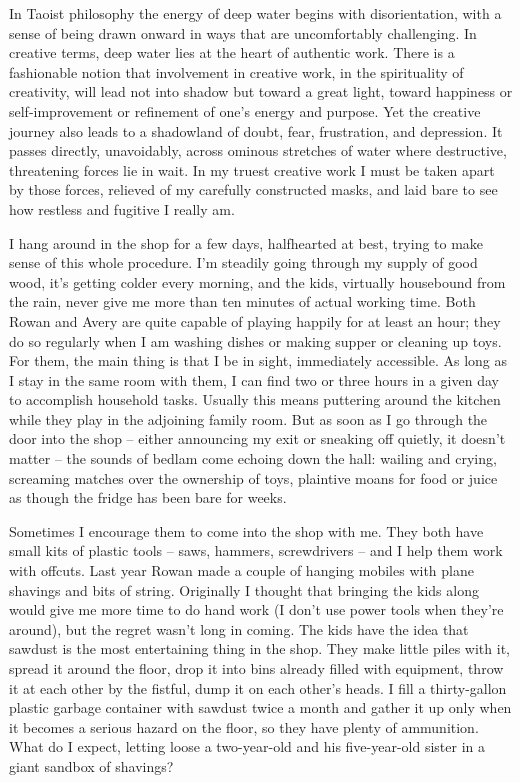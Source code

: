 \documentclass[letterpaper,10pt,headsepline]{scrreprt}
\begin{document}
In Taoist philosophy the energy of deep water begins with disorientation, with a sense of being drawn onward in ways that are uncomfortably challenging. In creative terms, deep water lies at the heart of authentic work. There is a fashionable notion that involvement in creative work, in the spirituality of creativity, will lead not into shadow but toward a great light, toward happiness or self-­improvement or refinement of one’s energy and purpose. Yet the creative journey also leads to a shadowland of doubt, fear, frustration, and depression. It passes directly, unavoidably, across ominous stretches of water where destructive, threatening forces lie in wait. In my truest creative work I must be taken apart by those forces, relieved of my carefully constructed masks, and laid bare to see how restless and fugitive I really am.

I hang around in the shop for a few days, halfhearted at best, trying to make sense of this whole procedure. I’m steadily going through my supply of good wood, it’s getting colder every morning, and the kids, virtually housebound from the rain, never give me more than ten minutes of actual working time. Both Rowan and Avery are quite capable of playing happily for at least an hour; they do so regularly when I am washing dishes or making supper or cleaning up toys. For them, the main thing is that I be in sight, immediately accessible. As long as I stay in the same room with them, I can find two or three hours in a given day to accomplish household tasks. Usually this means puttering around the kitchen while they play in the adjoining family room. But as soon as I go through the door into the shop – either announcing my exit or sneaking off quietly, it ­doesn’t matter – the sounds of bedlam come echoing down the hall: wailing and crying, screaming matches over the ownership of toys, plaintive moans for food or juice as though the fridge has been bare for weeks.

Sometimes I encourage them to come into the shop with me. They both have small kits of plastic tools – saws, hammers, screwdrivers – and I help them work with offcuts. Last year Rowan made a couple of hanging mobiles with plane shavings and bits of string. Originally I thought that bringing the kids along would give me more time to do hand work (I ­don’t use power tools when they’re around), but the regret ­wasn’t long in coming. The kids have the idea that sawdust is the most entertaining thing in the shop. They make little piles with it, spread it around the floor, drop it into bins already filled with equipment, throw it at each other by the fistful, dump it on each other’s heads. I fill a thirty-­gallon plastic garbage container with sawdust twice a month and gather it up only when it becomes a serious hazard on the floor, so they have plenty of ammunition. What do I expect, letting loose a two-­year-­old and his five-­year-­old sister in a giant sandbox of shavings?
\end{document}
